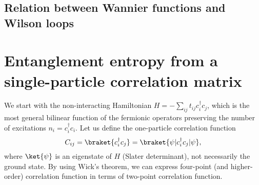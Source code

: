 \section{Relation between Wannier functions and Wilson loops}





\chapter{Entanglement entropy from a single-particle correlation matrix}
We start with the non-interacting Hamiltonian $H = - \sum_{ij} t_{ij} c^{\dagger}_i c_j$, which is the most general bilinear function of the fermionic operators preserving the number of excitations $n_i = c_i^{\dagger} c_i$. Let us define the one-particle correlation function
\begin{equation*}
C_{ij} = \braket{ c^{\dagger}_i c_j} = \braket{\psi | c^{\dagger}_i c_j | \psi} ,
\end{equation*}
where $\ket{\psi}$ is an eigenstate of $H$ (Slater determinant), not necessarily the ground state. By using Wick's theorem, we can express four-point (and higher-order) correlation function in terms of two-point correlation function. 

